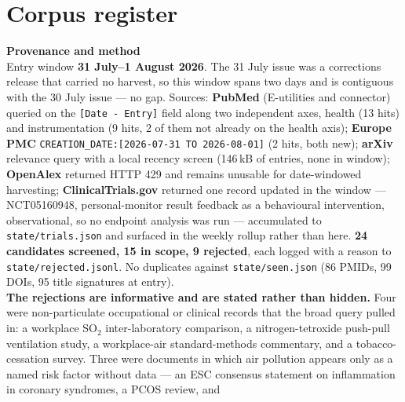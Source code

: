\documentclass[10pt]{article}
\begin{document}
\clearpage

\section*{\sffamily\bfseries\color{Deep}Corpus register}
\vspace{-1.5mm}{\color{Amber}\rule{\linewidth}{1.1pt}}\vspace{2.5mm}



\vspace{4mm}
\begin{keybox}
{\sffamily\bfseries\footnotesize\color{Deep}Provenance and method}\\[1.2mm]
{\fontsize{7.2}{8.8}\selectfont
Entry window \textbf{31 July--1 August 2026}. The 31 July issue was a corrections release
that carried no harvest, so this window spans two days and is contiguous with the 30 July
issue --- no gap. Sources: \textbf{PubMed} (E-utilities and connector) queried on the
\texttt{[Date - Entry]} field along two independent axes, health (13 hits) and
instrumentation (9 hits, 2 of them not already on the health axis); \textbf{Europe PMC}
\texttt{CREATION\_DATE:[2026-07-31 TO 2026-08-01]} (2 hits, both new); \textbf{arXiv}
relevance query with a local recency screen (146\,kB of entries, none in window);
\textbf{OpenAlex} returned HTTP 429 and remains unusable for date-windowed harvesting;
\textbf{ClinicalTrials.gov} returned one record updated in the window --- NCT05160948,
personal-monitor result feedback as a behavioural intervention, observational, so no
endpoint analysis was run --- accumulated to \texttt{state/trials.json} and surfaced in
the weekly rollup rather than here. \textbf{24 candidates screened, 15 in scope, 9 rejected}, each logged with a
reason to \texttt{state/rejected.jsonl}. No duplicates against \texttt{state/seen.json}
(86 PMIDs, 99 DOIs, 95 title signatures at entry).
\\[1.0mm]
\textbf{The rejections are informative and are stated rather than hidden.} Four were
non-particulate occupational or clinical records that the broad query pulled in: a
workplace SO$_2$ inter-laboratory comparison, a nitrogen-tetroxide push-pull ventilation
study, a workplace-air standard-methods commentary, and a tobacco-cessation survey. Three
were documents in which air pollution appears only as a named risk factor without data
--- an ESC consensus statement on inflammation in coronary syndromes, a PCOS review, and
}
\end{keybox}
\end{document}
